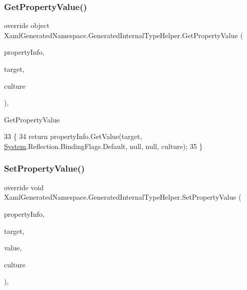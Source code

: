 \subsubsection{\texorpdfstring{Get\+Property\+Value()}{GetPropertyValue()}\hspace{0.1cm}{\footnotesize\ttfamily [3/3]}}
{\footnotesize\ttfamily override object Xaml\+Generated\+Namespace.\+Generated\+Internal\+Type\+Helper.\+Get\+Property\+Value (\begin{DoxyParamCaption}\item[{System.\+Reflection.\+Property\+Info}]{property\+Info,  }\item[{object}]{target,  }\item[{System.\+Globalization.\+Culture\+Info}]{culture }\end{DoxyParamCaption})\hspace{0.3cm}{\ttfamily [inline]}, {\ttfamily [protected]}}



Get\+Property\+Value 


\begin{DoxyCode}
33                                                                                                            
                                                    \{
34             \textcolor{keywordflow}{return} propertyInfo.GetValue(target, \hyperlink{namespaceSystem}{System}.Reflection.BindingFlags.Default, null, null, 
      culture);
35         \}
\end{DoxyCode}
\mbox{\label{classXamlGeneratedNamespace_1_1GeneratedInternalTypeHelper_ade0f04c0f7b18dd5b170e071d5534d38}} 
\subsubsection{\texorpdfstring{Set\+Property\+Value()}{SetPropertyValue()}\hspace{0.1cm}{\footnotesize\ttfamily [1/3]}}
{\footnotesize\ttfamily override void Xaml\+Generated\+Namespace.\+Generated\+Internal\+Type\+Helper.\+Set\+Property\+Value (\begin{DoxyParamCaption}\item[{System.\+Reflection.\+Property\+Info}]{property\+Info,  }\item[{object}]{target,  }\item[{object}]{value,  }\item[{System.\+Globalization.\+Culture\+Info}]{culture }\end{DoxyParamCaption})\hspace{0.3cm}{\ttfamily [inline]}, {\ttfamily [protected]}}



